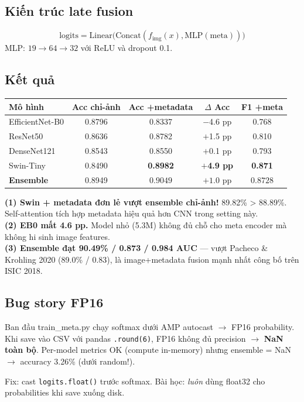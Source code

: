 \documentclass[11pt,a4paper]{article}
\begin{document}
\subsection{Kiến trúc late fusion}

\[
  \text{logits} = \text{Linear}\bigl(\text{Concat}(f_{\text{img}}(x), \text{MLP}(\text{meta}))\bigr)
\]
MLP: $19 \to 64 \to 32$ với ReLU và dropout 0.1.

\subsection{Kết quả}

\begin{table}[h]
\centering\small
\begin{tabular}{lcccc}
\toprule
\textbf{Mô hình} & \textbf{Acc chỉ-ảnh} & \textbf{Acc +metadata} & \textbf{$\Delta$ Acc} & \textbf{F1 +meta} \\
\midrule
EfficientNet-B0 & 0.8796 & 0.8337 & $-$4.6 pp & 0.768 \\
ResNet50        & 0.8636 & 0.8782 & $+$1.5 pp & 0.810 \\
DenseNet121     & 0.8543 & 0.8550 & $+$0.1 pp & 0.793 \\
Swin-Tiny       & 0.8490 & \textbf{0.8982} & \textbf{$+$4.9 pp} & \textbf{0.871} \\
\midrule
\rowcolor{usthblue!10}
\textbf{Ensemble} & 0.8949 & $\mathbf{0.9049}$ & $\mathbf{+1.0}$ pp & $\mathbf{0.8728}$ \\
\bottomrule
\end{tabular}
\end{table}

\begin{idea}
\textbf{(1) Swin + metadata đơn lẻ vượt ensemble chỉ-ảnh!} 89.82\% > 88.89\%. Self-attention tích hợp metadata hiệu quả hơn CNN trong setting này.\\
\textbf{(2) EB0 mất 4.6 pp.} Model nhỏ (5.3M) không đủ chỗ cho meta encoder mà không hi sinh image features.\\
\textbf{(3) Ensemble đạt 90.49\% / 0.873 / 0.984 AUC} --- vượt Pacheco \& Krohling 2020 (89.0\% / 0.83), là image+metadata fusion mạnh nhất công bố trên ISIC 2018.
\end{idea}

\subsection{Bug story FP16}

\begin{example}
Ban đầu train\_meta.py chạy softmax dưới AMP autocast $\to$ FP16 probability. Khi save vào CSV với pandas \texttt{.round(6)}, FP16 không đủ precision $\to$ \textbf{NaN toàn bộ}. Per-model metrics OK (compute in-memory) nhưng ensemble = NaN $\to$ accuracy 3.26\% (dưới random!).

Fix: cast \texttt{logits.float()} trước softmax. Bài học: \textit{luôn} dùng float32 cho probabilities khi save xuống disk.
\end{example}
\end{document}
